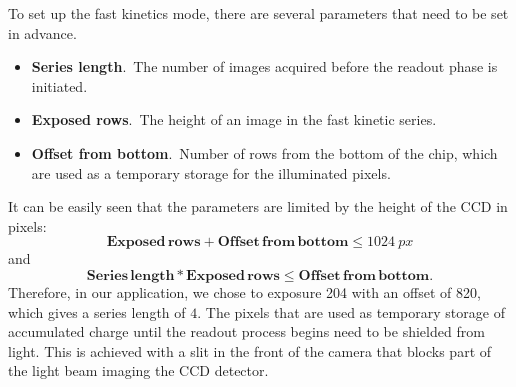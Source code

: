 
To set up the fast kinetics mode, there are several parameters that need to be set in advance.
\begin{itemize}
	\item \textbf{Series length}.\, The number of images acquired before the readout phase is initiated.
	\item \textbf{Exposed rows}.\, The height of an image in the fast kinetic series.
	\item \textbf{Offset from bottom}.\, Number of rows from the bottom of the chip, which are used as a temporary storage for the illuminated pixels.
\end{itemize}

It can be easily seen that the parameters are limited by the height of the CCD in pixels:
\begin{equation}
\mathbf{Exposed\,rows} + \mathbf{Offset\,from\,bottom} \leq \SI{1024}{px}
\end{equation}
and
\begin{equation}
\mathbf{Series\,length}*\mathbf{Exposed\,rows} \leq \mathbf{Offset\,from\,bottom}.
\end{equation}
Therefore, in our application, we chose to exposure \SI{204}{\px} with an offset of \SI{820}{\px}, which gives a series length of $4$.
The pixels that are used as temporary storage of accumulated charge until the readout process begins need to be shielded from light. This is achieved with a slit in the front of the camera that blocks part of the light beam imaging the CCD detector.

